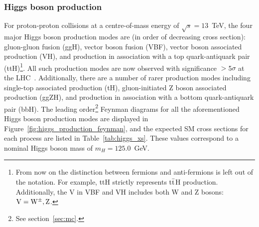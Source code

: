\subsubsection{Higgs boson production}
For proton-proton collisions at a centre-of-mass energy of $\sqrt{s}=13$~TeV, the four major Higgs boson production modes are (in order of decreasing cross section): gluon-gluon fusion (ggH), vector boson fusion (VBF), vector boson associated production (VH), and production in association with a top quark-antiquark pair (ttH)\footnote{From now on the distinction between fermions and anti-fermions is left out of the notation. For example, ttH strictly represents t$\bar{\rm{t}}$H production. Additionally, the V in VBF and VH includes both W and Z bosons: ${\rm{V}}={\rm{W}}^{\pm},{\rm{Z}}$.}. All such production modes are now observed with significance $>$5$\sigma$ at the LHC~\cite{CMS-PAS-HIG-19-005,Aad:2019mbh}. Additionally, there are a number of rarer production modes including single-top associated production (tH), gluon-initiated Z boson associated production (ggZH), and production in association with a bottom quark-antiquark pair (bbH). The leading order\footnote{See section~\ref{sec:mc}.} Feynman diagrams for all the aforementioned Higgs boson production modes are displayed in Figure~\ref{fig:higgs_production_feynman}, and the expected SM cross sections for each process are listed in Table~\ref{tab:higgs_xs}. These values correspond to a nominal Higgs boson mass of $m_H=125.0$~GeV.

